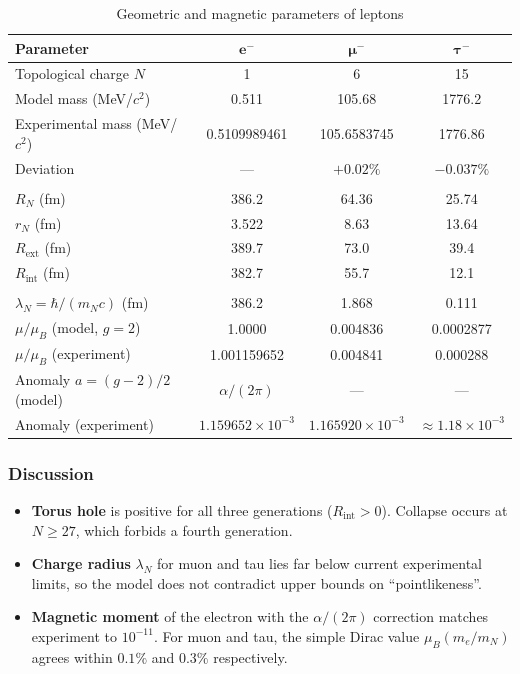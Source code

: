 \documentclass[11pt,a4paper]{article}
\begin{document}
\begin{table}[htbp]
\centering
\caption{Geometric and magnetic parameters of leptons}
\renewcommand{\arraystretch}{1.3}
\begin{tabular}{lccc}
\toprule
\textbf{Parameter} & $\bm{e^-}$ & $\bm{\mu^-}$ & $\bm{\tau^-}$ \\
\midrule
Topological charge $N$ & 1 & 6 & 15 \\
Model mass (MeV/$c^2$) & 0.511 & 105.68 & 1776.2 \\
Experimental mass (MeV/$c^2$) & 0.5109989461 & 105.6583745 & 1776.86 \\
Deviation & --- & $+0.02\%$ & $-0.037\%$ \\
\addlinespace
\multicolumn{4}{c}{\textit{Parameters of the neutral core}} \\
\midrule
$R_N$ (fm) & 386.2 & 64.36 & 25.74 \\
$r_N$ (fm) & 3.522 & 8.63 & 13.64 \\
$R_{\text{ext}}$ (fm) & 389.7 & 73.0 & 39.4 \\
$R_{\text{int}}$ (fm) & 382.7 & 55.7 & 12.1 \\
\addlinespace
\multicolumn{4}{c}{\textit{Charge radius and magnetic moment}} \\
\midrule
$\lambda_N = \hbar/(m_N c)$ (fm) & 386.2 & 1.868 & 0.111 \\
$\mu/\mu_B$ (model, $g=2$) & 1.0000 & 0.004836 & 0.0002877 \\
$\mu/\mu_B$ (experiment) & 1.001159652 & 0.004841 & 0.000288 \\
Anomaly $a=(g-2)/2$ (model) & $\alpha/(2\pi)$ & --- & --- \\
Anomaly (experiment) & $1.159652\times10^{-3}$ & $1.165920\times10^{-3}$ & $\approx1.18\times10^{-3}$ \\
\bottomrule
\end{tabular}
\label{tab:leptons_final}
\end{table}

\subsubsection{Discussion}
\begin{itemize}
\item \textbf{Torus hole} is positive for all three generations ($R_{\text{int}}>0$). Collapse occurs at $N\ge27$, which forbids a fourth generation.
\item \textbf{Charge radius} $\lambda_N$ for muon and tau lies far below current experimental limits, so the model does not contradict upper bounds on ``pointlikeness''.
\item \textbf{Magnetic moment} of the electron with the $\alpha/(2\pi)$ correction matches experiment to $10^{-11}$. For muon and tau, the simple Dirac value $\mu_B(m_e/m_N)$ agrees within $0.1\%$ and $0.3\%$ respectively.
\end{itemize}
\end{document}
